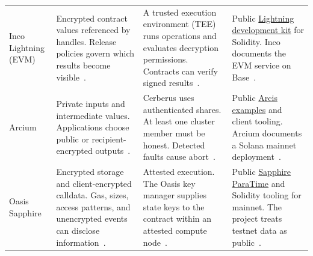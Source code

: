 \begin{longtable}{>{\raggedright\arraybackslash}m{}>{\raggedright\arraybackslash}m{}>{\raggedright\arraybackslash}m{}>{\raggedright\arraybackslash}m{}}
\addlinespace[3pt]
Inco Lightning (EVM) & Encrypted contract values referenced by handles. Release policies govern which results become visible~\cite{platform-inco}. & A trusted execution environment (TEE) runs operations and evaluates decryption permissions. Contracts can verify signed results~\cite{platform-inco}. & Public \href{https://github.com/Inco-fhevm/lightning-rod}{Lightning development kit} for Solidity. Inco documents the EVM service on Base~\cite{platform-inco}. \\
\addlinespace[3pt]
Arcium & Private inputs and intermediate values. Applications choose public or recipient-encrypted outputs~\cite{platform-arcium}. & Cerberus uses authenticated shares. At least one cluster member must be honest. Detected faults cause abort~\cite{platform-arcium}. & Public \href{https://github.com/arcium-hq/examples}{Arcis examples} and client tooling. Arcium documents a Solana mainnet deployment~\cite{platform-arcium}. \\
\addlinespace[3pt]
Oasis Sapphire & Encrypted storage and client-encrypted calldata. Gas, sizes, access patterns, and unencrypted events can disclose information~\cite{platform-sapphire}. & Attested execution. The Oasis key manager supplies state keys to the contract within an attested compute node~\cite{platform-sapphire}. & Public \href{https://github.com/oasisprotocol/sapphire-paratime}{Sapphire ParaTime} and Solidity tooling for mainnet. The project treats testnet data as public~\cite{platform-sapphire}. \\
\bottomrule
\end{longtable}

